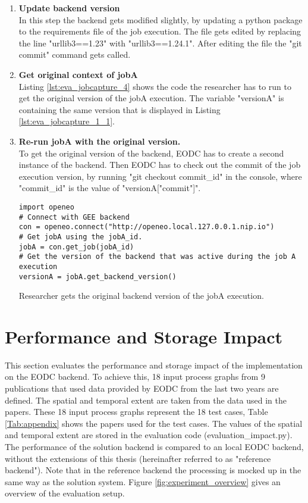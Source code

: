 \documentclass[draft,final]{vutinfth} %
\newenvironment{code}{\captionsetup{type=listing}}{}
\begin{document}
\begin{enumerate}
	\item \textbf{Update backend version} \\
	In this step the backend gets modified slightly, by updating a python package to the requirements file of the job execution. The file gets edited by replacing the line "urllib3==1.23" with "urllib3==1.24.1". After editing the file the "git commit" command gets called. 
	\item \textbf{Get original context of jobA} \\
	Listing \ref{lst:eva_jobcapture_4} shows the code the researcher has to run to get the original version of the jobA execution. The variable "versionA" is containing the same version that is displayed in Listing \ref{lst:eva_jobcapture_1_1}. 
	\item \textbf{Re-run jobA with the original version.} \\
	To get the original version of the backend, EODC has to create a second instance of the backend. Then EODC has to check out the commit of the job execution version, by running "git checkout commit\_id" in the console, where "commit\_id" is the value of "versionA["commit"]".
	\begin{code}
		\begin{verbatim}
import openeo
# Connect with GEE backend
con = openeo.connect("http://openeo.local.127.0.0.1.nip.io")
# Get jobA using the jobA_id.
jobA = con.get_job(jobA_id)
# Get the version of the backend that was active during the job A execution
versionA = jobA.get_backend_version()
		\end{verbatim}
		\caption{Researcher gets the original backend version of the jobA execution.}
		\label{lst:eva_jobcapture_4}
	\end{code}	
	
\end{enumerate}

\section{Performance and Storage Impact}\label{Evaluation:impact}

This section evaluates the performance and storage impact of the implementation on the EODC backend. To achieve this, 18 input process graphs from 9 publications that used data provided by EODC from the last two years are defined. The spatial and temporal extent are taken from the data used in the papers. These 18 input process graphs represent the 18 test cases, Table \ref{Tab:appendix} shows the papers used for the test cases. The values of the spatial and temporal extent are stored in the evaluation code (evaluation\_impact.py). The performance of the solution backend is compared to an local EODC backend, without the extensions of this thesis (hereinafter referred to as "reference backend"). Note that in the reference backend the processing is mocked up in the same way as the solution system. Figure \ref{fig:experiment_overview} gives an overview of the evaluation setup.  
\end{document}
